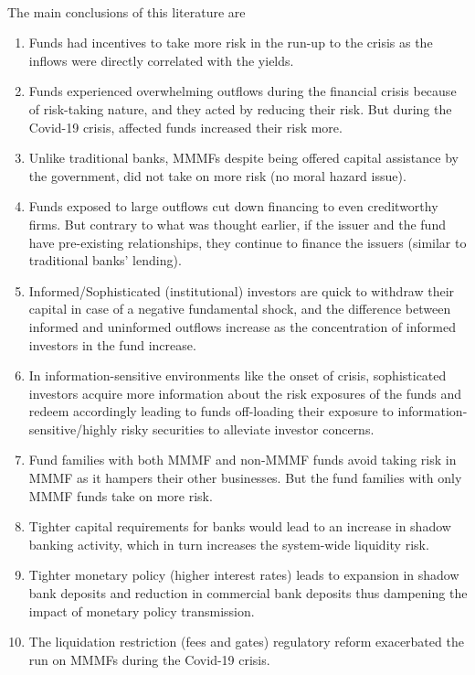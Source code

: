 \documentclass[11pt]{article}
\begin{document}
\paragraph{} The main conclusions of this literature are 
\begin{enumerate}
    \item Funds had incentives to take more risk in the run-up to the crisis as the inflows were directly correlated with the yields.
    \item Funds experienced overwhelming outflows during the financial crisis because of risk-taking nature, and they acted by reducing their risk. But during the Covid-19 crisis, affected funds increased their risk more. 
    \item Unlike traditional banks, MMMFs despite being offered capital assistance by the government, did not take on more risk (no moral hazard issue).
    \item Funds exposed to large outflows cut down financing to even creditworthy firms. But contrary to what was thought earlier, if the issuer and the fund have pre-existing relationships, they continue to finance the issuers (similar to traditional banks' lending). 
    \item Informed/Sophisticated (institutional) investors are quick to withdraw their capital in case of a negative fundamental shock, and the difference between informed and uninformed outflows increase as the concentration of informed investors in the fund increase.
    \item In information-sensitive environments like the onset of crisis, sophisticated investors acquire more information about the risk exposures of the funds and redeem accordingly leading to funds off-loading their exposure to information-sensitive/highly risky securities to alleviate investor concerns.
    \item Fund families with both MMMF and non-MMMF funds avoid taking risk in MMMF as it hampers their other businesses. But the fund families with only MMMF funds take on more risk.
    \item Tighter capital requirements for banks would lead to an increase in shadow banking activity, which in turn increases the system-wide liquidity risk.
    \item Tighter monetary policy (higher interest rates) leads to expansion in shadow bank deposits and reduction in commercial bank deposits thus dampening the impact of monetary policy transmission. 
    \item The liquidation restriction (fees and gates) regulatory reform exacerbated the run on MMMFs during the Covid-19 crisis.
\end{enumerate}
\end{document}
